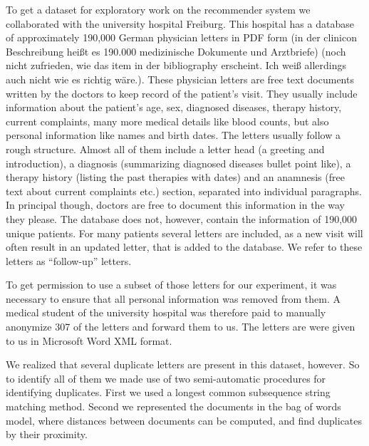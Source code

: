 To get a dataset for exploratory work on the recommender system we collaborated with the university hospital Freiburg. This hospital has a database of approximately 190,000 German
physician letters in PDF form \citep{spadaro2012} (in der clinicon Beschreibung heißt es 190.000 medizinische Dokumente und Arztbriefe) (noch nicht zufrieden, wie das item in der bibliography erscheint. Ich weiß allerdings auch nicht wie es richtig wäre.). These physician letters are free text documents
written by the doctors to keep record of the patient's visit. They
usually include information about the patient's age, sex, diagnosed
diseases, therapy history, current complaints, many more medical details
like blood counts, but also personal information like names and birth dates.
The letters usually follow a rough structure. Almost all of them include a letter head (a greeting and introduction), a diagnosis (summarizing diagnosed diseases bullet point like), a therapy history (listing the past therapies with dates) and an anamnesis (free text about current complaints etc.) section, separated into individual paragraphs. In principal though, doctors are free to document this information in the way they please. The database does not, however, contain the information of 190,000 unique patients. For many patients several letters are included, as a new visit will often result in an updated letter, that is added to the database. We refer to these letters as ``follow-up'' letters.

To get permission to use a subset of those letters for our experiment, it was necessary to ensure that all personal information was removed from them. A medical student of the university hospital was therefore paid to manually anonymize 307 of the letters and forward them to us. The letters are were given to us in Microsoft Word XML format.

We realized that several duplicate letters are present in this dataset, however. So to identify all of them we made use of two semi-automatic procedures for identifying duplicates. First we used a longest common subsequence string matching method. Second we represented the documents in the bag of words model, where distances between documents can be computed, and find duplicates by their proximity.


